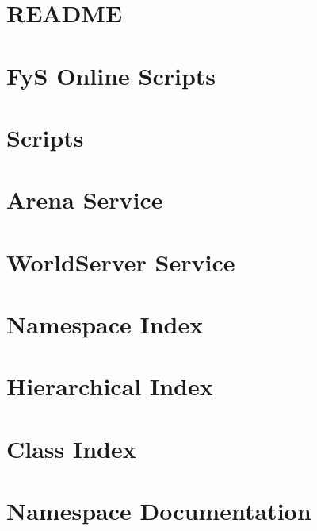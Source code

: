 \let\mypdfximage\pdfximage\def\pdfximage{\immediate\mypdfximage}\documentclass[twoside]{book}
\newcommand{\+}{\discretionary{\mbox{\scriptsize$\hookleftarrow$}}{}{}}
\begin{document}
\chapter{R\+E\+A\+D\+ME}
\label{md__home__fy_s__project__fy_s__r_e_a_d_m_e}

\chapter{FyS Online Scripts}
\label{md__home__fy_s__project__fy_s_scripting_cache__r_e_a_d_m_e}

\chapter{Scripts}
\label{md__home__fy_s__project__fy_s_scripting_cache_scripts__r_e_a_d_m_e}

\chapter{Arena Service}
\label{md__home__fy_s__project__fy_s_services_arena__r_e_a_d_m_e}

\chapter{World\+Server Service}
\label{md__home__fy_s__project__fy_s_services_worldserver__r_e_a_d_m_e}

\chapter{Namespace Index}

\chapter{Hierarchical Index}

\chapter{Class Index}

\chapter{Namespace Documentation}


\end{document}
